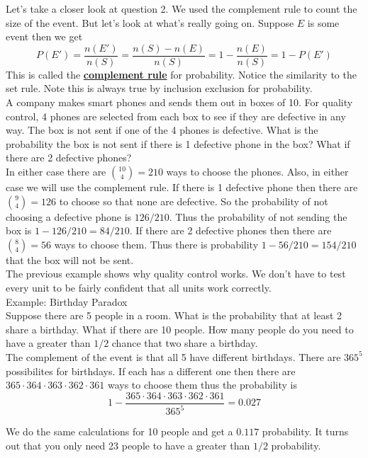 \documentclass[14,fleqn]{article}
\newcommand{\defn}[1]{\textbf{\underline{#1}}}
\begin{document}
Let's take a closer look at question 2. We used the complement rule to count the size of the event. But let's look at what's really going on. Suppose $E$ is some event then we get
\[
	P(E')=\frac{n(E')}{n(S)}=\frac{n(S)-n(E)}{n(S)}=1-\frac{n(E)}{n(S)}=1-P(E')
\]
This is called the \defn{complement rule} for probability. Notice the similarity to the set rule. Note this is always true by inclusion exclusion for probability.\\

A company makes smart phones and sends them out in boxes of 10. For quality control, 4 phones are selected from each box to see if they are defective in any way. The box is not sent if one of the 4 phones is defective. What is the probability the box is not sent if there is 1 defective phone in the box? What if there are 2 defective phones?\\

In either case there are $\binom{10}{4}=210$ ways to choose the phones. Also, in either case we will use the complement rule. If there is 1 defective phone then there are $\binom{9}{4}=126$ to choose so that none are defective. So the probability of not choosing a defective phone is $126/210.$ Thus the probability of not sending the box is $1-126/210=84/210.$ If there are 2 defective phones then there are $\binom{8}{4}=56$ ways to choose them. Thus there is probability $1-56/210=154/210$ that the box will not be sent.\\

The previous example shows why quality control works. We don't have to test every unit to be fairly confident that all units work correctly.\\

Example: Birthday Paradox\\
Suppose there are 5 people in a room. What is the probability that at least 2 share a birthday. What if there are 10 people. How many people do you need to have a greater than $1/2$ chance that two share a birthday.\\

The complement of the event is that all 5 have different birthdays. There are $365^5$ possibilites for birthdays. If each has a different one then there are $365\cdot 364\cdot 363\cdot 362\cdot 361$ ways to choose them thus the probability is
\[
	1-\frac{365\cdot 364\cdot 363\cdot 362\cdot 361}{365^5}=0.027
\]

We do the same calculations for 10 people and get a $0.117$ probability. It turns out that you only need 23 people to have a greater than $1/2$ probability.
\end{document}
